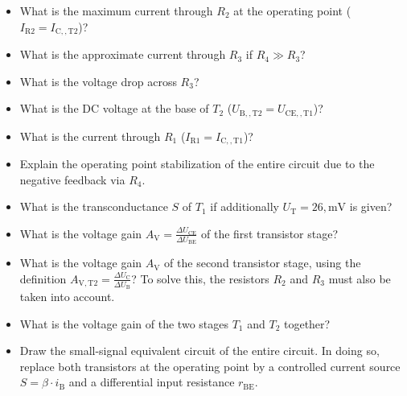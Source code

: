 {  \begin{itemize}
      \item[a)]
      What is the maximum current through $R_2$ at the operating point ($I_\mathrm{R2} = I_\mathrm{C,,T2}$)?
      \item[b)]
      What is the approximate current through $R_3$ if $R_4 \gg R_3$?
      \item[c)]
      What is the voltage drop across $R_3$?
      \item[d)]
      What is the DC voltage at the base of $T_2$ ($U_\mathrm{B,,T2} = U_\mathrm{CE,,T1}$)?
      \item[e)]
      What is the current through $R_1$ ($I_\mathrm{R1} = I_\mathrm{C,,T1}$)?
      \item[f)]
      Explain the operating point stabilization of the entire circuit due to the negative feedback via $R_4$.
      \item[g)]
      What is the transconductance $S$ of $T_1$ if additionally $U_\mathrm{T} = 26,\mathrm{mV}$ is given?
      \item[h)]
      What is the voltage gain $A_\mathrm{V} = \frac{\Delta U_\mathrm{CE}}{\Delta U_\mathrm{BE}}$ of the first transistor stage?
      \item[i)]
      What is the voltage gain $A_\mathrm{V}$ of the second transistor stage, using the definition $A_\mathrm{V,T2} = \frac{\Delta U_\mathrm{C}}{\Delta U_\mathrm{B}}$?
      To solve this, the resistors $R_2$ and $R_3$ must also be taken into account.
      \item[j)]
      What is the voltage gain of the two stages $T_1$ and $T_2$ together?
      \item[k)]
      Draw the small-signal equivalent circuit of the entire circuit. In doing so, replace both transistors at the operating point by a controlled current source $S = \beta \cdot i_\mathrm{B}$ and a differential input resistance $r_\mathrm{BE}$.

  \end{itemize}
}



